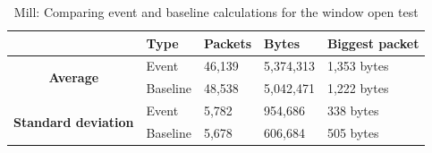 \begin{table}[H]
    \centering
    \caption{Mill: Comparing event and baseline calculations for the window open test}
    \begin{tabular}{c|l|l|l|l|}
        \cline{2-5}
        \multicolumn{1}{l|}{}                                              & \textbf{Type} & \textbf{Packets} & \textbf{Bytes} & \textbf{Biggest packet} \\ \hline
        \multicolumn{1}{|c|}{\multirow{2}{*}{\textbf{Average}}}            & Event         & 46,139           & 5,374,313      & 1,353 bytes             \\ \cline{2-5} 
        \multicolumn{1}{|c|}{}                                             & Baseline      & 48,538           & 5,042,471      & 1,222 bytes              \\ \hline
        \multicolumn{1}{|c|}{\multirow{2}{*}{\textbf{Standard deviation}}} & Event         & 5,782            & 954,686        & 338 bytes              \\ \cline{2-5} 
        \multicolumn{1}{|c|}{}                                             & Baseline      & 5,678            & 606,684        & 505 bytes             \\ \hline          
    \end{tabular}
    \label{tab:MillComparingBaselineAndWindowCalculations}
\end{table}

